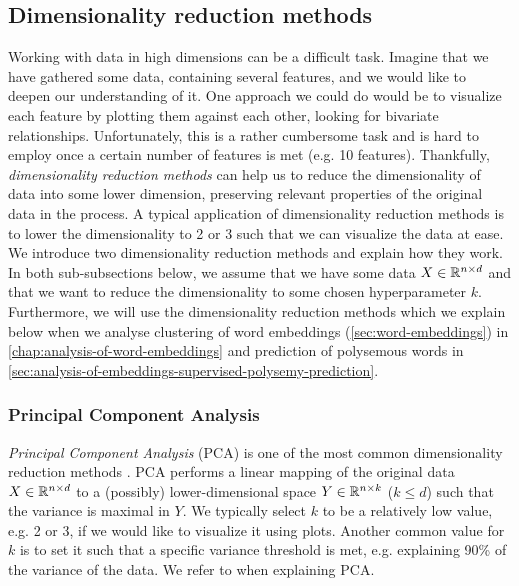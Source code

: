 \subsection{Dimensionality reduction methods}
\label{sec:dimensionality-reduction-methods}
Working with data in high dimensions can be a difficult task. Imagine that we have gathered some data, containing several features, and we would like to deepen our understanding of it. One approach we could do would be to visualize each feature by plotting them against each other, looking for bivariate relationships. Unfortunately, this is a rather cumbersome task and is hard to employ once a certain number of features is met (e.g. 10 features). Thankfully, \textit{dimensionality reduction methods} can help us to reduce the dimensionality of data into some lower dimension, preserving relevant properties of the original data in the process. A typical application of dimensionality reduction methods is to lower the dimensionality to 2 or 3 such that we can visualize the data at ease. We introduce two dimensionality reduction methods and explain how they work. In both sub-subsections below, we assume that we have some data $X \in \mathbb{R}^{n \times d}$ and that we want to reduce the dimensionality to some chosen hyperparameter $k$. Furthermore, we will use the dimensionality reduction methods which we explain below when we analyse clustering of word embeddings (\cref{sec:word-embeddings}) in \cref{chap:analysis-of-word-embeddings} and prediction of polysemous words in \cref{sec:analysis-of-embeddings-supervised-polysemy-prediction}.

\subsubsection{Principal Component Analysis}
\label{sec:pca}
\textit{Principal Component Analysis} (PCA) is one of the most common dimensionality reduction methods \cite{Jolliffe2002}. PCA performs a linear mapping of the original data $X \in \mathbb{R}^{n \times d}$ to a (possibly) lower-dimensional space $Y \in \mathbb{R}^{n \times k}$ ($k \leq d$) such that the variance is maximal in $Y$. We typically select $k$ to be a relatively low value, e.g. 2 or 3, if we would like to visualize it using plots. Another common value for $k$ is to set it such that a specific variance threshold is met, e.g. explaining 90\% of the variance of the data. We refer to \cite{Jolliffe2002} when explaining PCA.

